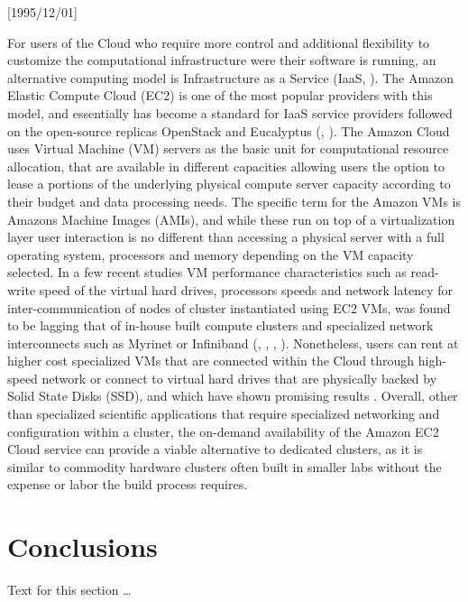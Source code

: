 \NeedsTeXFormat{LaTeX2e}[1995/12/01] \documentclass[10pt]{bmc_article}
\newenvironment{bmcformat}{\begin{raggedright}\baselineskip20pt\sloppy\setboolean{publ}{false}}{\end{raggedright}\baselineskip20pt\sloppy}
\begin{document}
\begin{bmcformat}
For users of the Cloud who require more control and additional flexibility to customize the computational infrastructure 
were their software is running, an alternative computing model is Infrastructure as a Service (IaaS, \cite{bhardwaj2010cloud}).
The Amazon Elastic Compute Cloud (EC2) is one of the most popular providers with this model, and essentially has become 
a standard for IaaS service providers followed on the open-source replicas OpenStack and Eucalyptus (\cite{openstack}, 
\cite{euca}). The Amazon Cloud uses Virtual Machine (VM) servers as the basic unit for computational resource allocation, 
that are available in different capacities \cite{instancetypes} allowing users the option to lease a portions of the underlying 
physical compute server capacity according to their budget and data processing needs. The specific term for the Amazon VMs is 
Amazons Machine Images (AMIs), and while these  run on top of a virtualization layer user interaction is no different than 
accessing a physical server with a full operating system, processors and memory depending on the VM capacity selected. In
a few recent studies VM performance characteristics such as read-write speed of the virtual hard drives, processors speeds and 
network latency for inter-communication of nodes of cluster instantiated using EC2 VMs, was found to be lagging that of  
in-house built compute clusters and specialized network interconnects such as Myrinet or Infiniband (\cite{jackson2010}, 
\cite{hill2009quantitative}, \cite{boden1995myrinet}, \cite{infiniband2000infiniband}). Nonetheless, users can rent at higher 
cost specialized VMs \cite{instancetypes} that are connected within the Cloud through high-speed network or connect to 
virtual hard  drives that are physically backed by Solid State Disks (SSD), and which have shown promising results \cite{jackson2010}. 
Overall, other than specialized scientific applications that require specialized networking and configuration within a cluster, 
the on-demand availability of the Amazon EC2 Cloud service can provide a viable alternative to dedicated clusters, as it is 
similar to commodity hardware clusters often built in smaller labs without the expense or labor the build process requires. \pb






\section*{Conclusions} Text for this section \ldots





\end{bmcformat}
\end{document}
